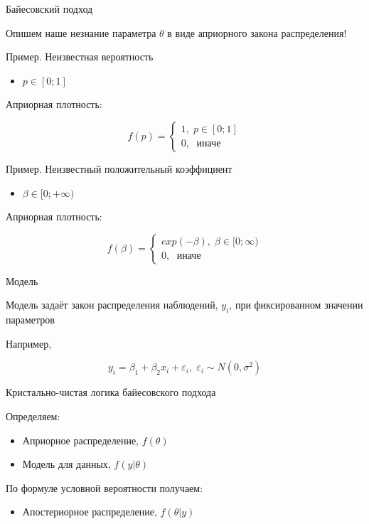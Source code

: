 \documentclass[ignorenonframetext,]{beamer}
\newcommand{\e}{\varepsilon}
\begin{document}
\begin{frame}{Байесовский подход}

Опишем наше незнание параметра \(\theta\) в виде априорного закона
распределения!

\end{frame}

\begin{frame}{Пример. Неизвестная вероятность}

\begin{itemize}
\itemsep1pt\parskip0pt
\item
  \(p \in [0;1]\)
\end{itemize}

Априорная плотность:

\[
f(p)=\begin{cases}
1, \; p\in[0;1] \\
0, \; \text{ иначе }
\end{cases}
\]

\end{frame}

\begin{frame}{Пример. Неизвестный положительный коэффициент}

\begin{itemize}
\itemsep1pt\parskip0pt
\item
  \(\beta \in [0;+\infty)\)
\end{itemize}

Априорная плотность:

\[
f(\beta)=\begin{cases}
exp(-\beta), \; \beta \in[0;\infty) \\
0, \; \text{ иначе }
\end{cases}
\]

\end{frame}

\begin{frame}{Модель}

Модель задаёт закон распределения наблюдений, \(y_i\), при фиксированном
значении параметров

Например,

\[
y_i = \beta_1 + \beta_2 x_i + \e_i, \; \e_i \sim N(0,\sigma^2)
\]

\end{frame}

\begin{frame}{Кристально-чистая логика байесовского подхода}

Определяем:

\begin{itemize}
\item
  Априорное распределение, \(f(\theta)\)
\item
  Модель для данных, \(f(y|\theta)\)
\end{itemize}

По формуле условной вероятности получаем:

\begin{itemize}
\itemsep1pt\parskip0pt
\item
  Апостериорное распределение, \(f(\theta|y)\)
\end{itemize}

\end{frame}
\end{document}
